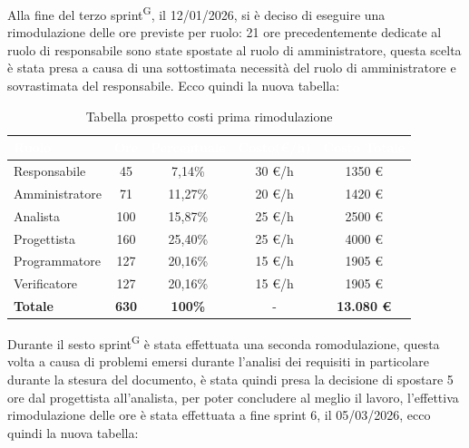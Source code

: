 \documentclass[a4paper, 11pt]{article}
\begin{document}
Alla fine del terzo sprint\textsuperscript{G}, il 12/01/2026, si è deciso di eseguire una rimodulazione delle ore previste per ruolo: 21 ore precedentemente dedicate al ruolo di responsabile sono state spostate al ruolo di amministratore, questa scelta è stata presa a causa di una sottostimata necessità del ruolo di amministratore e sovrastimata del responsabile.
Ecco quindi la nuova tabella:
\begin{table}[H]
  \centering
  \begin{tabular}{|l|c|c|c|c|}
    \hline
    \cellcolor{AccentColor}\textbf{\textcolor{white}{Ruolo}} & 
    \cellcolor{AccentColor}\textbf{\textcolor{white}{Ore}} & 
    \cellcolor{AccentColor}\textbf{\textcolor{white}{Percentuale}} & 
    \cellcolor{AccentColor}\textbf{\textcolor{white}{Costo(€/h)}} & 
    \cellcolor{AccentColor}\textbf{\textcolor{white}{Costo Totale}} \\
    \hline
    
    Responsabile & 45 & 7,14\% & 30 €/h & 1350 € \\ \hline
    Amministratore & 71 & 11,27\% & 20 €/h & 1420 € \\ \hline
    Analista & 100 & 15,87\% & 25 €/h & 2500 € \\ \hline
    Progettista & 160 & 25,40\% & 25 €/h & 4000 € \\ \hline
    Programmatore & 127 & 20,16\% & 15 €/h & 1905 € \\ \hline
    Verificatore & 127 & 20,16\% & 15 €/h & 1905 € \\ \hline
    \textbf{Totale} & \textbf{630} & \textbf{100\%} & - & \textbf{13.080 €} \\ \hline
  \end{tabular}
  \caption{Tabella prospetto costi prima rimodulazione}
\end{table}

Durante il sesto sprint\textsuperscript{G} è stata effettuata una seconda romodulazione, questa volta a causa di problemi emersi durante l'analisi dei requisiti in particolare durante la stesura del documento, è stata quindi presa la decisione di spostare 5 ore dal progettista all'analista, per poter concludere al meglio il lavoro, l'effettiva rimodulazione delle ore è stata effettuata a fine sprint 6, il 05/03/2026, ecco quindi la nuova tabella:
\end{document}
